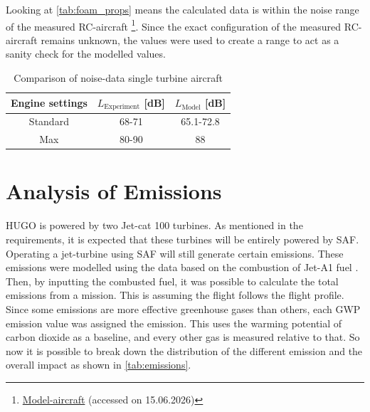 Looking at \autoref{tab:foam_props} means the calculated data is within the noise range of the measured RC-aircraft \footnote{\href{https://www.modelaviation.com/basicsofnoise}{Model-aircraft} (accessed on 15.06.2026) }. Since the exact configuration of the measured RC-aircraft remains unknown, the values were used to create a range to act as a sanity check for the modelled values.  


\begin{table}[H]
    \centering
    \caption{Comparison of noise-data single turbine aircraft}
    \label{tab:foam_props}
    \begin{tabular}{|c|c|c|}
        \hline
        \textbf{Engine settings} &
        \textbf{$L_\text{Experiment}$ \textbf{[dB]}}  &
         \textbf{$L_\text{Model}$ \textbf{[dB]}}\\
        \hline\hline
        Standard
        & 68-71 & 65.1-72.8  \\
        \hline
        Max 
        & 80-90 & 88 \\
        \hline
    \end{tabular}
\end{table}    

\section{Analysis of Emissions}
\label{sec:emission_analysis}

HUGO is powered by two Jet-cat 100 turbines. As mentioned in the requirements, it is expected that these turbines will be entirely powered by SAF. Operating a jet-turbine using SAF will still generate certain emissions. These emissions were modelled using the data based on the combustion of Jet-A1 fuel \cite{Gaillot2023}. Then, by inputting the combusted fuel, it was possible to calculate the total emissions from a mission. This is assuming the flight follows the flight profile. Since some emissions are more effective greenhouse gases than others, each GWP emission value was assigned the emission. This uses the warming potential of carbon dioxide as a baseline, and every other gas is measured relative to that. So now it is possible to break down the distribution of the different emission and the overall impact as shown in \autoref{tab:emissions}.  

